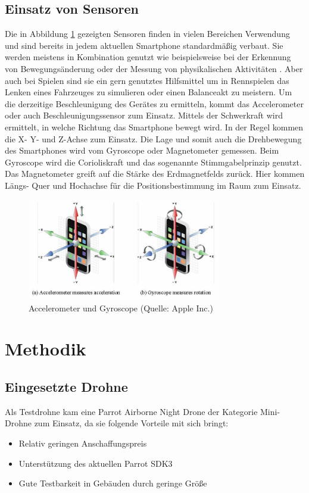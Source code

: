 \documentclass{article}
\begin{document}
\subsection{Einsatz von Sensoren}
Die in Abbildung \ref{fig:gyro} gezeigten Sensoren finden in vielen Bereichen Verwendung und sind bereits in jedem aktuellen Smartphone standardmäßig verbaut. 
Sie werden meistens in Kombination genutzt wie beispielsweise bei der Erkennung von Bewegungsänderung oder der Messung von physikalischen Aktivitäten \cite{wu2012classification}. Aber auch bei Spielen sind sie ein gern genutztes Hilfsmittel um in Rennspielen das Lenken eines Fahrzeuges zu simulieren oder einen Balanceakt zu meistern.
Um die derzeitige Beschleunigung des Gerätes zu ermitteln, kommt das Accelerometer oder auch Beschleunigungssensor zum Einsatz. Mittels der Schwerkraft wird ermittelt, in welche Richtung das Smartphone bewegt wird. In der Regel kommen die X- Y- und Z-Achse zum Einsatz. Die Lage und somit auch die Drehbewegung des Smartphones wird vom Gyroscope oder Magnetometer gemessen. Beim Gyroscope wird die Corioliskraft und das sogenannte Stimmgabelprinzip genutzt. Das Magnetometer greift auf die Stärke des Erdmagnetfelds zurück. Hier kommen Längs- Quer und Hochachse für die Positionsbestimmung im Raum zum Einsatz.
\begin{figure}
\begin{minipage}[b]{1.0\linewidth}
  \centering
\centerline{\includegraphics[width= 85mm]{gyro.jpg}}
\end{minipage}
\caption{Accelerometer und Gyroscope (Quelle: Apple Inc.)}
\label{fig:gyro}
\end{figure}

\section{Methodik}

\subsection{Eingesetzte Drohne}
Als Testdrohne kam eine Parrot Airborne Night Drone der Kategorie Mini-Drohne zum Einsatz\cite{minidrone}, da sie folgende Vorteile mit sich bringt:
\begin{itemize}
	\item Relativ geringen Anschaffungspreis
	\item Unterstützung des aktuellen Parrot SDK3
	\item Gute Testbarkeit in Gebäuden durch geringe Größe 
\end{itemize}
\end{document}
